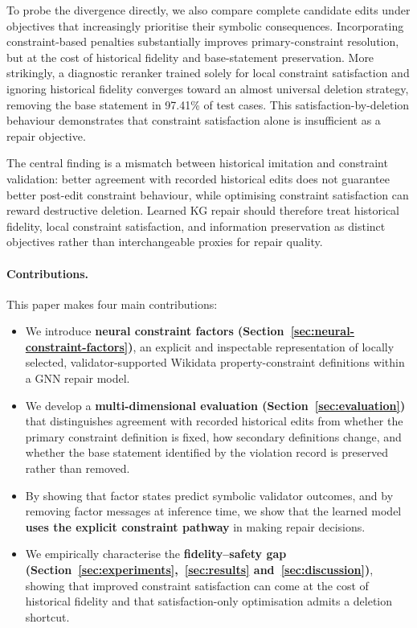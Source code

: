 \documentclass[a4paper,UKenglish,cleveref,autoref,thm-restate]{tgdk-v2021}
\begin{document}
To probe the divergence directly, we also compare complete candidate edits under objectives that increasingly prioritise their symbolic consequences. Incorporating constraint-based penalties substantially improves primary-constraint resolution, but at the cost of historical fidelity and base-statement preservation. More strikingly, a diagnostic reranker trained solely for local constraint satisfaction and ignoring historical fidelity converges toward an almost universal deletion strategy, removing the base statement in 97.41\% of test cases. This satisfaction-by-deletion behaviour demonstrates that constraint satisfaction alone is insufficient as a repair objective.

The central finding is a mismatch between historical imitation and constraint validation: better agreement with recorded historical edits does not guarantee better post-edit constraint behaviour, while optimising constraint satisfaction can reward destructive deletion. Learned KG repair should therefore treat historical fidelity, local constraint satisfaction, and information preservation as distinct objectives rather than interchangeable proxies for repair quality.

\paragraph*{Contributions.}
This paper makes four main contributions:
\begin{itemize}
    \item We introduce \textbf{neural constraint factors (Section~\ref{sec:neural-constraint-factors})}, an explicit and inspectable representation of locally selected, validator-supported Wikidata property-constraint definitions within a GNN repair model.
    \item We develop a \textbf{multi-dimensional evaluation (Section~\ref{sec:evaluation})} that distinguishes agreement with recorded historical edits from whether the primary constraint definition is fixed, how secondary definitions change, and whether the base statement identified by the violation record is preserved rather than removed.
    \item By showing that factor states predict symbolic validator outcomes, and by removing factor messages at inference time, we show that the learned model \textbf{uses the explicit constraint pathway} in making repair decisions.
    \item We empirically characterise the \textbf{fidelity--safety gap (Section~\ref{sec:experiments},~\ref{sec:results} and~\ref{sec:discussion})}, showing that improved constraint satisfaction can come at the cost of historical fidelity and that satisfaction-only optimisation admits a deletion shortcut.
\end{itemize}
\end{document}
